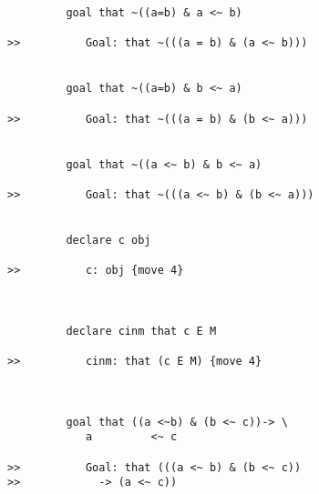 \documentclass[12pt]{article}
\begin{document}
\begin{verbatim}
         goal that ~((a=b) & a <~ b)

>>          Goal: that ~(((a = b) & (a <~ b)))


         goal that ~((a=b) & b <~ a)

>>          Goal: that ~(((a = b) & (b <~ a)))


         goal that ~((a <~ b) & b <~ a)

>>          Goal: that ~(((a <~ b) & (b <~ a)))


         declare c obj

>>          c: obj {move 4}



         declare cinm that c E M

>>          cinm: that (c E M) {move 4}



         goal that ((a <~b) & (b <~ c))-> \
            a         <~ c

>>          Goal: that (((a <~ b) & (b <~ c))
>>            -> (a <~ c))
\end{verbatim}
\end{document}
